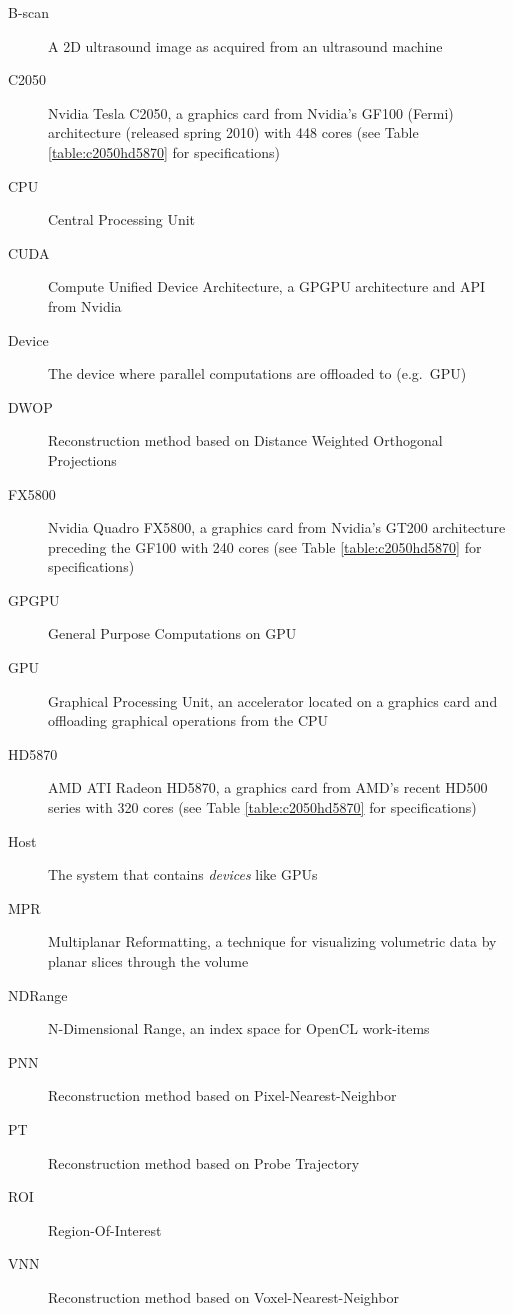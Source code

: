 \begin{description}
	\item[B-scan] A 2D ultrasound image as acquired from an ultrasound machine
	\item[C2050] Nvidia Tesla C2050, a graphics card from Nvidia's GF100 (Fermi) architecture (released spring 2010) with 448 cores (see Table \ref{table:c2050hd5870} for specifications)
	\item[CPU] Central Processing Unit
	\item[CUDA] Compute Unified Device Architecture, a GPGPU architecture and API from Nvidia
	\item[Device] The device where parallel computations are offloaded to (e.g.\ GPU)
	\item[DWOP] Reconstruction method based on Distance Weighted Orthogonal Projections \cite{trobaugh1994}
	\item[FX5800] Nvidia Quadro FX5800, a graphics card from Nvidia's GT200 architecture preceding the GF100 with 240 cores (see Table \ref{table:c2050hd5870} for specifications)
	\item[GPGPU] General Purpose Computations on GPU
	\item[GPU] Graphical Processing Unit, an accelerator located on a graphics card and offloading graphical operations from the CPU
	\item[HD5870] AMD ATI Radeon HD5870, a graphics card from AMD's recent HD500 series with 320 cores (see Table \ref{table:c2050hd5870} for specifications)
	\item[Host] The system that contains \emph{devices} like GPUs
	\item[MPR] Multiplanar Reformatting, a technique for visualizing volumetric data by planar slices through the volume
	\item[NDRange] N-Dimensional Range, an index space for OpenCL work-items
	\item[PNN] Reconstruction method based on Pixel-Nearest-Neighbor \cite{mccann1988}
	\item[PT] Reconstruction method based on Probe Trajectory \cite{coupe2005}
	\item[ROI] Region-Of-Interest
	\item[VNN] Reconstruction method based on Voxel-Nearest-Neighbor \cite{sherebrin1996}
\end{description}